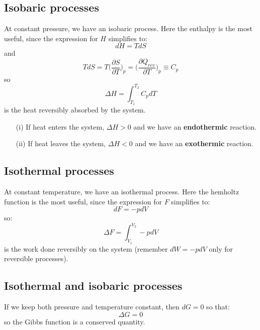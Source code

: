 \documentclass[a4paper,11pt,oneside]{book}
\begin{document}
\subsection*{Isobaric processes}

At constant pressure, we have an isobaric process. Here the enthalpy is the most useful, since the expression for $H$ simplifies to:
\begin{equation}
    dH = T dS
\end{equation}
and \begin{equation}
    T dS = T \bigg(\frac{\partial S}{\partial T}\bigg)_p = \bigg(\frac{\partial Q_{rev}}{\partial T}\bigg)_p \equiv C_p
\end{equation} 
so
\begin{equation}
    \Delta H = \int_{T_1}^{T_2} C_p dT  
\end{equation}
is the heat reversibly absorbed by the system. 
\begin{enumerate}
    \item[(i)] If heat enters the system, $\Delta H > 0$ and we have an \textbf{endothermic} reaction. 
    \item[(ii)] If heat leaves the system, $\Delta H<0$ and we have an \textbf{exothermic} reaction. 
\end{enumerate}

\subsection*{Isothermal processes}
At constant temperature, we have an isothermal process. Here the hemholtz function is the most useful, since the expression for $F$ simplifies to:
\begin{equation}
    dF = -p dV
\end{equation}
so:
\begin{equation}
    \Delta F = \int_{V_1}^{V_2}-pdV  
\end{equation}
is the work done reversibly on the system (remember $dW=-pdV$ only for reversible processes).

\subsection*{Isothermal and isobaric processes}
If we keep both pressure and temperature constant, then $dG = 0$ so that:
\begin{equation}
    \Delta G = 0
\end{equation}
so the Gibbs function is a conserved quantity. 
\end{document}
